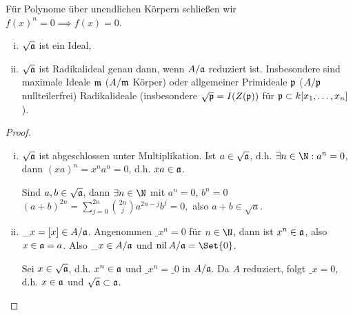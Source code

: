 \begin{ex}
    Für Polynome über unendlichen Körpern schließen wir $f(x)^n = 0 \implies f(x) = 0$.
\end{ex}

\begin{lem}
    \begin{enumerate}[i)]
        \item
            $\sqrt{\mathfrak{a}}$ ist ein Ideal,
        \item
            $\sqrt{\mathfrak{a}}$ ist Radikalideal genau dann, wenn $A / \mathfrak{a}$ reduziert ist.
            Insbesondere sind maximale Ideale $\mathfrak{m}$ ($A / \mathfrak{m}$ Körper) oder allgemeiner Primideale $\mathfrak{p}$ ($A / \mathfrak{p}$ nullteilerfrei) Radikalideale (insbesondere $\sqrt{\mathfrak{p}} = I(Z(\mathfrak{p}))$ für $\mathfrak{p} \subset k[x_1, \dotsc, x_n]$).
    \end{enumerate}
    \begin{proof}
        \begin{enumerate}[i)]
            \item
                $\sqrt{\mathfrak{a}}$ ist abgeschlossen unter Multiplikation.
                Ist $a \in \sqrt{\mathfrak{a}}$, d.h. $\exists n \in \N: a^n = 0$, dann $(xa)^n = x^n a^n = 0$, d.h. $x a \in \mathfrak{a}$.

                Sind $a, b \in \sqrt{\mathfrak{a}}$, dann $\exists n \in \N$ mit $a^n = 0$, $b^n = 0$
                \begin{math}
                    (a + b)^{2n} = \sum_{j=0}^{2n} \binom{2n}{j} a^{2n-j}b^j = 0,
                \end{math}
                also $a + b \in \sqrt{a}$.
            \item
                \begin{seg}{\ProofImplication}
                    $\_ x = [x] \in A / \mathfrak{a}$.
                    Angenommen $\_x^n = 0$ für $n \in \N$, dann ist $x^n \in \mathfrak{a}$, also $x \in \mathfrak{a} = a$.
                    Also $\_x \in A / \mathfrak{a}$ und $\nil A / \frk a = \Set{0}$.
                \end{seg}
                \begin{seg}{\ProofImplication*}
                    Sei $x \in \sqrt{\mathfrak{a}}$, d.h. $x^n \in \mathfrak{a}$ und $\_{x^n} = \_0$ in $A / \mathfrak{a}$.
                    Da $A$ reduziert, folgt $\_x = 0$, d.h. $x \in \mathfrak{a}$ und $\sqrt{\mathfrak{a}} \subset \mathfrak{a}$.
                \end{seg}
        \end{enumerate}
    \end{proof}
\end{lem}

